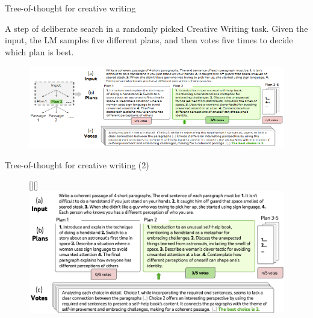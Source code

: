 

\begin{vbframe}{Tree-of-thought for creative writing}

\vfill

A step of deliberate search in a randomly picked Creative Writing task. Given the input, the LM samples five different plans, and then votes five times to decide which plan is best.
    
\begin{figure}
    \centering
    \includegraphics{figure/tot_creative_writing.png}\\
\end{figure}

\vfill

\end{vbframe}

\begin{vbframe}{Tree-of-thought for creative writing (2)}

\vfill
    
\begin{figure}
\raisebox{0pt}[\height][\depth]{\hspace{-0.85cm}%
    \includegraphics[width=1.15\textwidth]{figure/totcreativebig.png}
}
\end{figure}

\vfill

\end{vbframe}

